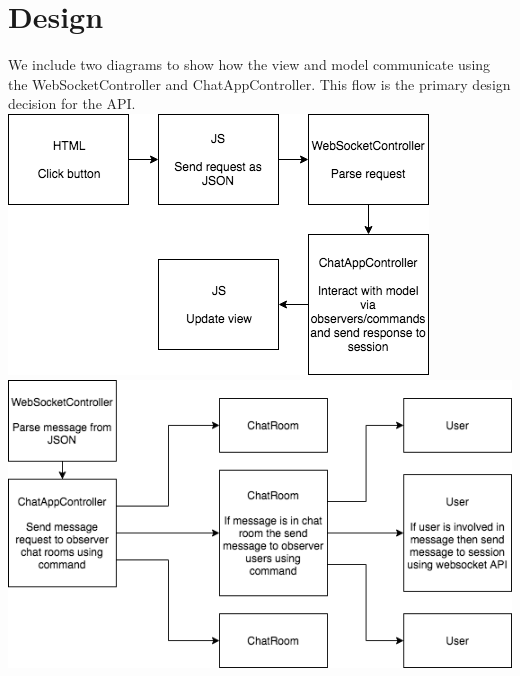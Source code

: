 \documentclass[letterpaper, 11pt]{article}
\begin{document}
\section{Design}
We include two diagrams to show how the view and model communicate using the WebSocketController and ChatAppController. This flow is the primary design decision for the API. \\

\includegraphics[width=\textwidth]{request_handling} \\
\includegraphics[width=\textwidth]{message_sending}
\end{document}
